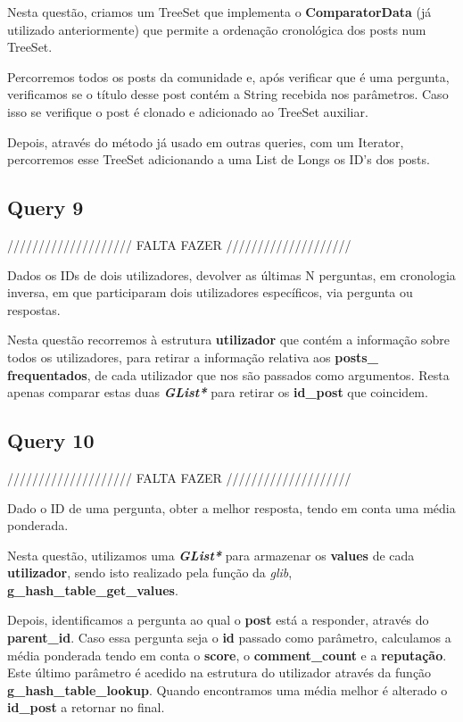 \documentclass[a4paper]{article}
\begin{document}
Nesta questão, criamos um TreeSet que implementa o \textbf{ComparatorData} (já
utilizado anteriormente) que permite a ordenação cronológica dos posts num TreeSet.

Percorremos todos os posts da comunidade e, após verificar que é uma pergunta,
verificamos se o título desse post contém a String recebida nos parâmetros. Caso 
isso se verifique o post é clonado e adicionado ao TreeSet auxiliar.

Depois, através do método já usado em outras queries, com um Iterator, percorremos
esse TreeSet adicionando a uma List de Longs os ID's dos posts.

\subsection{Query 9}

//////////////////// FALTA FAZER ////////////////////

Dados os IDs de dois utilizadores, devolver as últimas N perguntas, em
cronologia inversa, em que participaram dois utilizadores específicos, 
via pergunta ou respostas.

Nesta questão recorremos à estrutura \textbf{utilizador} que contém a 
informação sobre todos os utilizadores, para retirar a informação relativa 
aos \textbf{posts\_} \textbf{frequentados}, de cada utilizador que nos são 
passados como argumentos. Resta apenas comparar estas duas 
\textit{\textbf{GList*}} para retirar os \textbf{id\_post} que coincidem.

\subsection{Query 10}

//////////////////// FALTA FAZER ////////////////////

Dado o ID de uma pergunta, obter a melhor resposta, tendo em conta
uma média ponderada.

Nesta questão, utilizamos uma \textit{\textbf{GList*}} para armazenar 
os \textbf{values} de cada \textbf{utilizador}, sendo isto realizado
pela função da \textit{glib}, \textbf{g\_hash\_table\_get\_values}.

Depois, identificamos a pergunta ao qual o \textbf{post} está a responder,
através do \textbf{parent\_id}. Caso essa pergunta seja o \textbf{id}
passado como parâmetro, calculamos a média ponderada tendo em conta o
\textbf{score}, o \textbf{comment\_count} e a \textbf{reputação}. Este
último parâmetro é acedido na estrutura do utilizador através da função
\textbf{g\_hash\_table\_lookup}. Quando encontramos uma média melhor é
alterado o \textbf{id\_post} a retornar no final.
\end{document}
